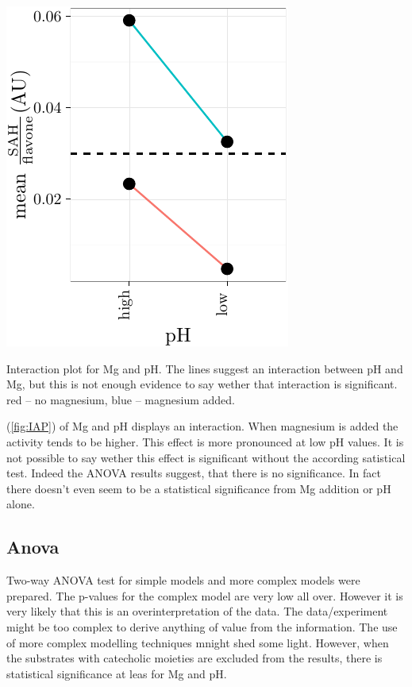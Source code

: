 \documentclass[]{tufte-handout}
\begin{document}
\begin{marginfigure}
 \includegraphics{tufte_files/figure-latex/IAP-1.pdf}
\caption{Interaction plot for Mg and pH. The lines suggest an interaction between pH and Mg, but this is not enough evidence to say wether that interaction is significant. red -- no magnesium, blue -- magnesium added.}
\end{marginfigure}

(\ref{fig:IAP}) of Mg and pH displays
an interaction. When magnesium is added the activity tends to be higher.
This effect is more pronounced at low pH values. It is not possible to
say wether this effect is significant without the according satistical
test. Indeed the ANOVA results suggest, that there is no significance.
In fact there doesn't even seem to be a statistical significance from Mg
addition or pH alone.

\subsection{Anova}\label{anova}

Two-way ANOVA test for simple models and more complex models were
prepared. The p-values for the complex model are very low all over.
However it is very likely that this is an overinterpretation of the
data. The data/experiment might be too complex to derive anything of
value from the information. The use of more complex modelling techniques
mnight shed some light. However, when the substrates with catecholic
moieties are excluded from the results, there is statistical
significance at leas for Mg and pH.
\end{document}
